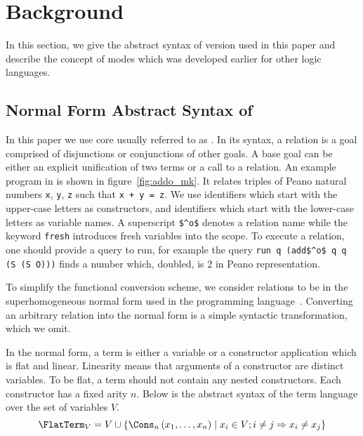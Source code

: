 \section{Background}

In this section, we give the abstract syntax of \mk version used in this paper and describe the concept of modes which was developed earlier for other logic languages.

\subsection{Normal Form Abstract Syntax of \mk}

In this paper we use core \mk usually referred to as \micro.
In its syntax, a relation is a goal comprised of disjunctions or conjunctions of other goals.
A base goal can be either an explicit unification of two terms or a call to a relation.
An example program in \mk is shown in figure~\ref{fig:addo_mk}.
It relates triples of Peano natural numbers \lstinline{x}, \lstinline{y}, \lstinline{z} such that \lstinline{x + y = z}.
We use identifiers which start with the upper-case letters as constructors, and identifiers which start with the lower-case letters as variable names.
A superscript \lstinline{$^o$} denotes a relation name while the keyword \lstinline{fresh} introduces fresh variables into the scope.
To execute a relation, one should provide a query to run, for example the query \lstinline{run q (add$^o$ q q (S (S O)))} finds a number which, doubled, is 2 in Peano representation.





To simplify the functional conversion scheme, we consider \mk relations to be in the superhomogeneous normal form used in the \merc programming language~\cite{somogyi1996execution}.
Converting an arbitrary \mk relation into the normal form is a simple syntactic transformation, which we omit.

In the normal form, a term is either a variable or a constructor application which is flat and linear.
Linearity means that arguments of a constructor are distinct variables.
To be flat, a term should not contain any nested constructors.
Each constructor has a fixed arity $n$.
Below is the abstract syntax of the term language over the set of variables $V$.
\[  \FlatTerm_{V} = V \cup \{\Cons_{n}\left( x_1, \ldots, x_{n} \right) \mid x_{i}\in V; i \neq j \Rightarrow x_i \neq x_j\} \]


